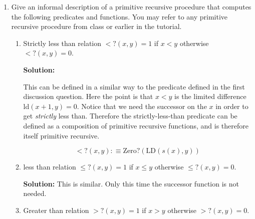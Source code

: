 \documentclass[11pt]{report}
\begin{document}
\begin{enumerate}
\begin{enumerate}
			\item $\PA \ \vdash \ \forall x \ \forall y \ [(x\leq y) \land (y\leq x)] \to x=y \hspace{3.8cm} \text{(Challenge!!!)}$
			
			{\bf Solution:} 

		\end{enumerate}

		\vspace{0.5cm}
		\newpage
		\begin{center}
			{\bf Primitive Recursive Functions}
		\end{center}

		For each of the procedures below it is sufficient to provide an informal explanation of how they can be computed from primitive recursive functions using composition and recursion. For an extra challenge, you can also provide the formal definition from the base primitive recursive functions. 

		\item Give an informal description of a primitive recursive procedure that computes the following predicates and functions. You may refer to any primitive recursive procedure from class or earlier in the tutorial. 
	
		\begin{enumerate}

			\item Strictly less than relation $<?(x,y) = 1$ if $x<y$ otherwise $<?(x,y) = 0$.
			
			{\bf Solution:} 

			This can be defined in a similar way to the predicate defined in the first discussion question. Here the point is that $x<y$ is the limited difference ld$(x+1,y) = 0$. Notice that we need the successor on the $x$ in order to get \emph{strictly} less than. Therefore the strictly-less-than predicate can be defined as a composition of primitive recursive functions, and is therefore itself primitive recursive. 

			$$<?(x,y) :\equiv \text{Zero?}(\text{LD}(s(x),y))$$
			
			\item  less than relation $\leq ?(x,y) = 1$ if $x\leq y$ otherwise $\leq ?(x,y) = 0$.
			
			{\bf Solution:} This is similar. Only this time the successor function is not needed. 
			
			\item Greater than relation $>?(x,y) = 1$ if $x>y$ otherwise $>?(x,y) = 0$.
			

\end{enumerate}
\end{enumerate}
\end{document}
